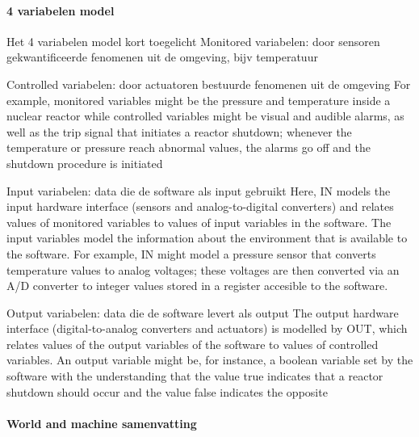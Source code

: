 \paragraph{4 variabelen model}





Het 4 variabelen model kort toegelicht
Monitored variabelen: door sensoren gekwantificeerde fenomenen uit de omgeving, bijv temperatuur

Controlled variabelen: door actuatoren bestuurde fenomenen uit de omgeving
For example, monitored variables might be the pressure and temperature
inside a nuclear reactor while controlled variables might be visual and audible alarms, as well
as the trip signal that initiates a reactor shutdown; whenever the temperature or pressure reach
abnormal values, the alarms go off and the shutdown procedure is initiated

Input variabelen: data die de software als input gebruikt
Here, IN models the input hardware interface (sensors and analog-to-digital converters) and
relates values of monitored variables to values of input variables in the software. The input variables model the information about the environment that is available to the software. For example,
IN might model a pressure sensor that converts temperature values to analog voltages; these voltages are then converted via an A/D converter to integer values stored in a register accesible to the
software.

Output variabelen: data die de software levert als output
The output hardware interface (digital-to-analog converters and actuators) is modelled
by OUT, which relates values of the output variables of the software to values of controlled variables. An output variable might be, for instance, a boolean variable set by the software with the
understanding that the value true indicates that a reactor shutdown should occur and the value
false indicates the opposite




\paragraph{World and machine samenvatting}

